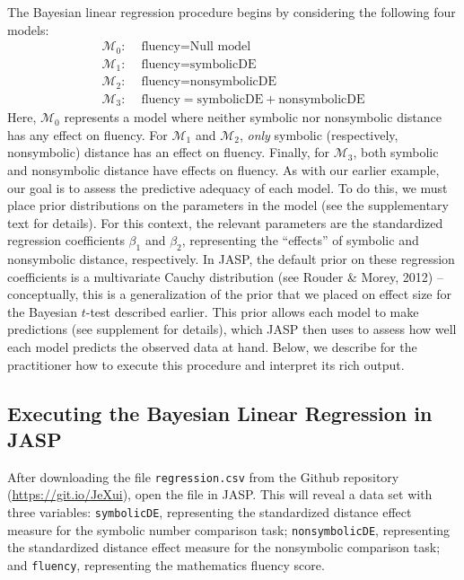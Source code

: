 \documentclass[english,,doc,floatsintext]{apa6}
\begin{document}
The Bayesian linear regression procedure begins by considering the following four models:
\begin{align*}
\mathcal{M}_{0}: & \text{ fluency} = \text{Null model} \\
\mathcal{M}_{1}: & \text{ fluency} = \text{symbolicDE} \\
\mathcal{M}_{2}: & \text{ fluency} = \text{nonsymbolicDE} \\
\mathcal{M}_{3}: & \text{ fluency} = \text{symbolicDE}+\text{nonsymbolicDE}
\end{align*}
Here, \(\mathcal{M}_0\) represents a model where neither symbolic nor nonsymbolic distance has any effect on fluency. For \(\mathcal{M}_1\) and \(\mathcal{M}_2\), \emph{only} symbolic (respectively, nonsymbolic) distance has an effect on fluency. Finally, for \(\mathcal{M}_3\), both symbolic and nonsymbolic distance have effects on fluency. As with our earlier example, our goal is to assess the predictive adequacy of each model. To do this, we must place prior distributions on the parameters in the model (see the supplementary text for details). For this context, the relevant parameters are the standardized regression coefficients \(\beta_1\) and \(\beta_2\), representing the \enquote{effects} of symbolic and nonsymbolic distance, respectively. In JASP, the default prior on these regression coefficients is a multivariate Cauchy distribution (see Rouder \& Morey, 2012) -- conceptually, this is a generalization of the prior that we placed on effect size for the Bayesian \(t\)-test described earlier. This prior allows each model to make predictions (see supplement for details), which JASP then uses to assess how well each model predicts the observed data at hand. Below, we describe for the practitioner how to execute this procedure and interpret its rich output.

\hypertarget{executing-the-bayesian-linear-regression-in-jasp}{%
\subsection{Executing the Bayesian Linear Regression in JASP}\label{executing-the-bayesian-linear-regression-in-jasp}}

After downloading the file \texttt{regression.csv} from the Github repository (\url{https://git.io/JeXui}), open the file in JASP. This will reveal a data set with three variables: \texttt{symbolicDE}, representing the standardized distance effect measure for the symbolic number comparison task; \texttt{nonsymbolicDE}, representing the standardized distance effect measure for the nonsymbolic comparison task; and \texttt{fluency}, representing the mathematics fluency score.
\end{document}
